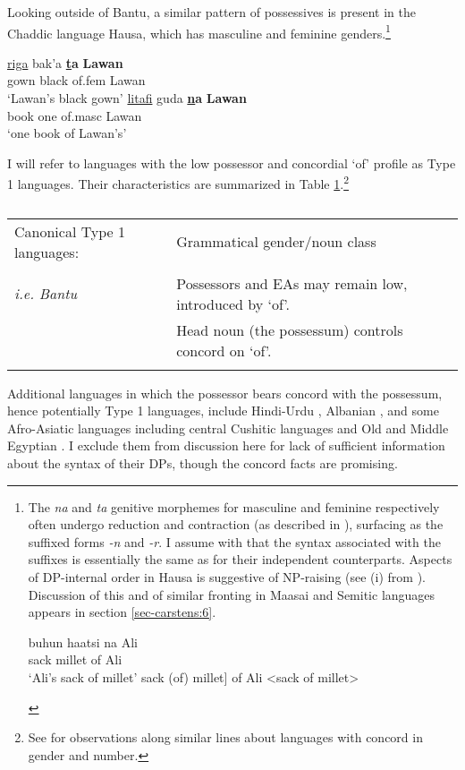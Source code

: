 \documentclass[output=paper
,modfonts
,nonflat]{langsci/langscibook}
\begin{document}
Looking outside of Bantu, a similar pattern of possessives is present in the Chaddic language Hausa, which has masculine and feminine genders.\footnote{The \textit{na} and \textit{ta} genitive morphemes for masculine and feminine respectively often undergo reduction and contraction (as described in \citealt{Tuller1986}), surfacing as the suffixed forms \textit{-n} and \textit{-r}. I assume with \citet{Tuller1986} that the syntax associated with the suffixes is essentially the same as for their independent counterparts. Aspects of DP-internal order in Hausa is suggestive of NP-raising (see (i) from \citealt[30]{Tuller1986}). Discussion of this and of similar fronting in Maasai and Semitic languages appears in section \ref{sec-carstens:6}.
\begin{exe}
	\ex 
	\xlist
	\ex 
	\gll buhun haatsi na Ali\\
	sack     millet  of Ali\\
	\glt `Ali's sack of millet'  	
	\ex {[}sack (of) millet{]} of Ali <sack of millet>
	
	\endxlist
\end{exe}}

\begin{exe}
	\ex \label{ex-carstens:12} \citep[301]{Newman2000}
	\xlist
	\ex 
	\gll \underline{riga}   bak’a   \textbf{\underline{t}a}       \textbf{Lawan} \\
	gown   black   of.fem    Lawan\\
	\glt `Lawan’s black gown'  	
	\ex 
	\gll \underline{litafi}     guda \textbf{\underline{n}a}       \textbf{Lawan}\\
	book one  of.masc  Lawan\\
	\glt `one book of Lawan's'
	\endxlist
\end{exe}
I will refer to languages with the low possessor and concordial `of' profile as Type 1 languages. Their characteristics are summarized in Table \ref{tab-carstens:1}.\footnote{See \citet{Giusti2008} for observations along similar lines about languages with concord in gender and number.} 
\begin{table}
	\caption{}
	\label{tab-carstens:1}
	\begin{tabularx}{\textwidth}{lX}
		\lsptoprule
		Canonical Type 1 languages: & Grammatical gender/noun class\\ \\
		\textit{i.e. Bantu} & Possessors and EAs may remain low, introduced by ‘of’.\\
		& Head noun (the possessum) controls concord on ‘of’.\\
		\lspbottomrule
	\end{tabularx}
\end{table}  \noindent
Additional languages in which the possessor bears concord with the possessum, hence potentially Type 1 languages, include Hindi-Urdu \citep{Bogel_Butt2013}, Albanian \citep{Spencer2007}, and some Afro-Asiatic languages including central Cushitic languages \citep{Hetzron1995} and Old and Middle Egyptian \citep{Haspelmath2015}. I exclude them from discussion here for lack of sufficient information about the syntax of their DPs, though the concord facts are promising.
\end{document}
